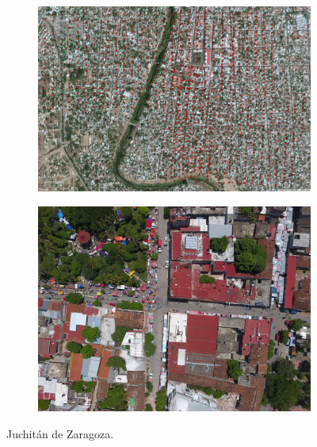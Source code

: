 \begin{figure}[!h]
  \centering
    \begin{subfigure}{.8\textwidth}
        \includegraphics[width=\textwidth]{images/juchitan-satellite.jpg}
    \end{subfigure}
    \begin{subfigure}{.8\textwidth}
        \includegraphics[width=\textwidth]{images/juchitan-sample.jpg}
    \end{subfigure}
  \caption{Juchit\'an de Zaragoza.}
  \label{fig:juchitan}
\end{figure}

